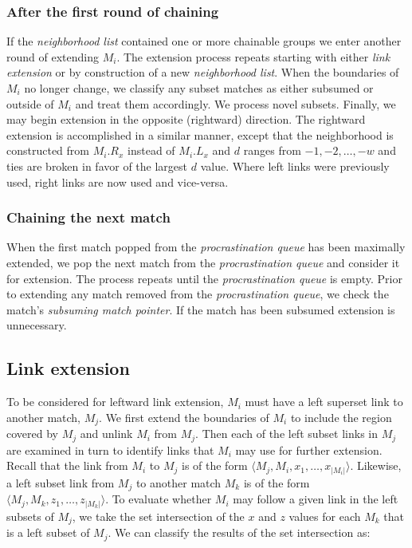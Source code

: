 \documentclass{llncs}
\begin{document}
\subsubsection{After the first round of chaining}

If the \textit{neighborhood list} contained one or more chainable
groups we enter another round of extending $M_i$. The extension
process repeats starting with either \textit{link extension} or by
construction of a new \textit{neighborhood list}. When the
boundaries of $M_i$ no longer change, we classify any subset matches
as either subsumed or outside of $M_i$ and treat them accordingly.
We process novel subsets.  Finally, we may begin extension in the
opposite (rightward) direction. The rightward extension is
accomplished in a similar manner, except that the neighborhood is
constructed from $M_i.R_x$ instead of $M_i.L_x$ and $d$ ranges from
$-1, -2,\dots,-w$ and ties are broken in favor of the largest $d$
value. Where left links were previously used, right links are now
used and vice-versa.

\subsubsection{Chaining the next match}

When the first match popped from the \textit{procrastination queue}
has been maximally extended, we pop the next match from the
\textit{procrastination queue} and consider it for extension. The
process repeats until the \textit{procrastination queue} is empty.
Prior to extending any match removed from the
\textit{procrastination queue}, we check the match's
\textit{subsuming match pointer}.  If the match has been subsumed
extension is unnecessary.

\subsection{Link extension}

To be considered for leftward link extension, $M_i$ must have a left
superset link to another match, $M_j$.  We first extend the
boundaries of $M_i$ to include the region covered by $M_j$ and
unlink $M_i$ from $M_j$.  Then each of the left subset links in
$M_j$ are examined in turn to identify links that $M_i$ may use for
further extension. Recall that the link from $M_i$ to $M_j$ is of
the form $\langle M_j, M_i, x_1, \dots, x_{|M_i|}\rangle$. Likewise,
a left subset link from $M_j$ to another match $M_k$ is of the form
$\langle M_j, M_k, z_1, \dots, z_{|M_k|}\rangle$. To evaluate
whether $M_i$ may follow a given link in the left subsets of $M_j$,
we take the set intersection of the $x$ and $z$ values for each
$M_k$ that is a left subset of $M_j$. We can classify the results of
the set intersection as:
\end{document}
